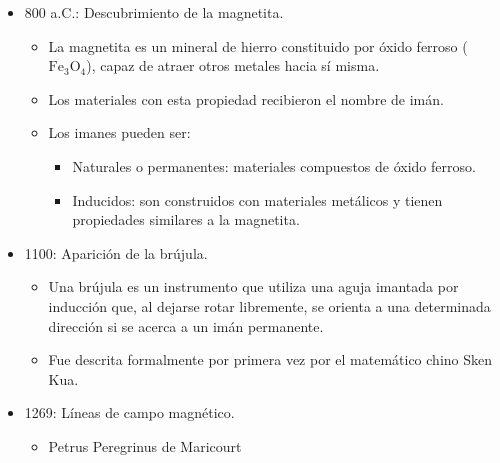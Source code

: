 \documentclass[a4paper,10pt]{article}
\begin{document}
\begin{itemize}
    
\item 800 a.C.: Descubrimiento de la magnetita.

    \begin{itemize}
    
    \item La magnetita es un mineral de hierro constituido por óxido ferroso
    ($\text{Fe}_3\text{O}_4$), capaz de atraer otros metales hacia sí misma.
    
    \item Los materiales con esta propiedad recibieron el nombre de imán.
    
    \item Los imanes pueden ser:
    
        \begin{itemize}
        
        \item Naturales o permanentes: materiales compuestos de óxido ferroso.
        
        \item Inducidos: son construidos con materiales metálicos y tienen propiedades
        similares a la magnetita. 
        
        \end{itemize}
    
    \end{itemize} 

\item 1100: Aparición de la brújula.

    \begin{itemize}
    
    \item Una brújula es un instrumento que utiliza una aguja imantada por inducción que,
    al dejarse rotar libremente, se orienta a una determinada dirección si se acerca a
    un imán permanente.
    
    \item Fue descrita formalmente por primera vez por el matemático chino Sken Kua.

    \end{itemize}

\item 1269: Líneas de campo magnético.

    \begin{itemize}
    
    \item Petrus Peregrinus de Maricourt
    

\end{itemize}
\end{itemize}
\end{document}
